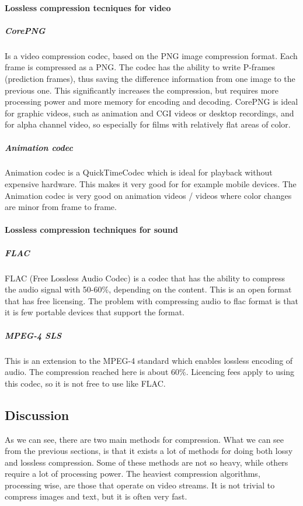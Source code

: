 \paragraph{Lossless compression tecniques for video}

\subparagraph{CorePNG}
Is a video compression codec, based on the PNG image compression format. Each frame is compressed as a PNG. The codec has the ability to write P-frames (prediction frames), thus saving the difference information from one image to the previous one. This significantly increases the compression, but requires more processing power and more memory for encoding and decoding. CorePNG is ideal for graphic videos, such as animation and CGI videos or desktop recordings, and for alpha channel video, so especially for films with relatively flat areas of color. \cite{bib:corePNG}

\subparagraph{Animation codec}
Animation codec is a QuickTimeCodec which is ideal for playback without expensive hardware.  This makes it very good for for example mobile devices. The Animation codec is very good on animation videos / videos where color changes are minor from frame to frame.
 \cite{bib:animationCodec}

\paragraph{Lossless compression techniques for sound}

\subparagraph{FLAC}
FLAC (Free Lossless Audio Codec) is a codec that has the ability to compress the audio signal with 50-60\%, depending on the content. This is an open format that has free licensing. The problem with compressing audio to flac format is that it is few portable devices that support the format. \cite{bib:FLAC}

\subparagraph{MPEG-4 SLS}
This is an extension to the MPEG-4 standard which enables lossless encoding of audio. The compression reached here is about 60\%. Licencing fees apply to using this codec, so it is not free to use like FLAC. \cite{bib:MPEGSLS}

\subsection{Discussion}
As we can see, there are two main methods for compression. What we can see from the previous sections, is that it exists a lot of methods for doing both lossy and lossless compression. Some of these methods are not so heavy, while others require a lot of processing power. The heaviest compression algorithms, processing wise, are those that operate on video streams. It is not trivial to compress images and text, but it is often very fast.

